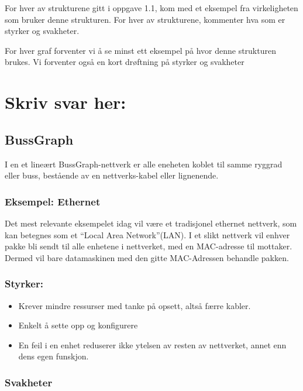 \documentclass[11pt]{article}
\providecommand{\tightlist}{%
      \setlength{\itemsep}{0pt}\setlength{\parskip}{0pt}}
\begin{document}
For hver av strukturene gitt i oppgave 1.1, kom med et eksempel fra
virkeligheten som bruker denne strukturen. For hver av strukturene,
kommenter hva som er styrker og svakheter.

For hver graf forventer vi å se minst ett eksempel på hvor denne
strukturen brukes. Vi forventer også en kort drøftning på styrker og
svakheter

    \hypertarget{skriv-svar-her}{%
\section*{Skriv svar her:}\label{skriv-svar-her}}

\hypertarget{bussgraph}{%
\subsection*{BussGraph}\label{bussgraph}}

I en et lineært BussGraph-nettverk er alle eneheten koblet til samme
ryggrad eller buss, bestående av en nettverks-kabel eller lignenende.

\hypertarget{eksempel-ethernet}{%
\subsubsection*{Eksempel: Ethernet}\label{eksempel-ethernet}}

Det mest relevante eksempelet idag vil være et tradisjonel ethernet
nettverk, som kan betegnes som et ``Local Area Network''(LAN). I et
slikt nettverk vil enhver pakke bli sendt til alle enhetene i
nettverket, med en MAC-adresse til mottaker. Dermed vil bare
datamaskinen med den gitte MAC-Adressen behandle pakken.

\hypertarget{styrker}{%
\subsubsection*{Styrker:}\label{styrker}}

\begin{itemize}
\tightlist
\item
  Krever mindre ressurser med tanke på opsett, altså færre kabler.
\item
  Enkelt å sette opp og konfigurere
\item
  En feil i en enhet reduserer ikke ytelsen av resten av nettverket,
  annet enn dens egen funskjon.
\end{itemize}

\hypertarget{svakheter}{%
\subsubsection*{Svakheter}\label{svakheter}}
\end{document}
